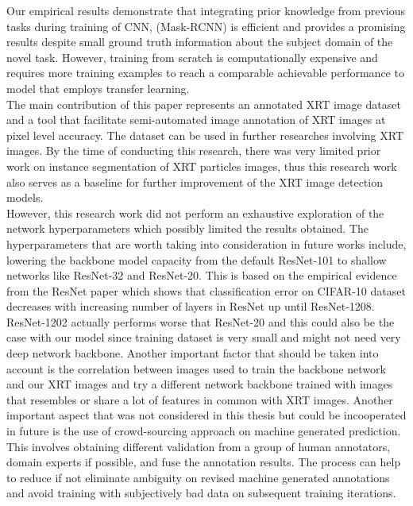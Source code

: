 \documentclass[conference]{IEEEtran}
\begin{document}
	Our empirical results demonstrate that integrating prior knowledge from previous tasks
during training of CNN, (Mask-RCNN) is efficient and provides a promising results despite small ground truth information about the subject domain of the novel task. However,
training from scratch is computationally expensive and requires more training examples
to reach a comparable achievable performance to model that employs transfer learning.\\
	
	The main contribution of this paper represents an annotated XRT image dataset
and a tool that facilitate semi-automated image annotation of XRT images at pixel level
accuracy. The dataset can be used in further researches involving XRT images. By the time
of conducting this research, there was very limited prior work on instance segmentation
of XRT particles images, thus this research work also serves as a baseline for further
improvement of the XRT image detection models.\\
	
	However, this research work did not perform an exhaustive exploration of the network
hyperparameters which possibly limited the results obtained. The hyperparameters that
are worth taking into consideration in future works include, lowering the backbone model
capacity from the default ResNet-101 to shallow networks like ResNet-32 and ResNet-20. This is based on the empirical evidence from the ResNet paper\cite{Ren} which shows that
classification error on CIFAR-10 dataset decreases with increasing number of layers in
ResNet up until ResNet-1208. ResNet-1202 actually performs worse that ResNet-20 and
this could also be the case with our model since training dataset is very small and might
not need very deep network backbone. Another important factor that should be taken into
account is the correlation between images used to train the backbone network and our XRT
images and try a different network backbone trained with images that resembles or share a
lot of features in common with XRT images.
Another important aspect that was not considered in this thesis but could be incooperated
in future is the use of crowd-sourcing approach on machine generated prediction. This
involves obtaining different validation from a group of human annotators, domain experts
if possible, and fuse the annotation results. The process can help to reduce if not eliminate
ambiguity on revised machine generated annotations and avoid training with subjectively
bad data on subsequent training iterations.
\end{document}
